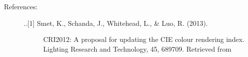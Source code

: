 \documentclass[letterpaper,10pt,english]{sphinxmanual}
\begin{document}
\begin{fulllineitems}
\begin{description}
\begin{quote}
\begin{description}
\end{description}\end{quote}

\item[{References:}] \leavevmode\begin{description}
\item[{..{[}1{]} Smet, K., Schanda, J., Whitehead, L., \& Luo, R. (2013). }] \leavevmode
CRI2012: A proposal for updating the CIE colour rendering index. 
Lighting Research and Technology, 45, 689\textendash{}709. 
Retrieved from 

\end{description}

\end{description}

\end{fulllineitems}

\end{document}
